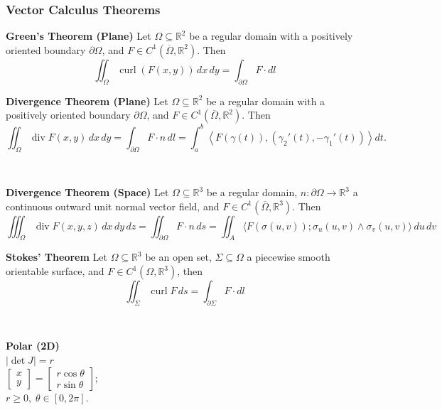 \documentclass[8pt]{article}
\begin{document}
\subsubsection*{Vector Calculus Theorems}
\begin{minipage}[htp]{0.49\textwidth}
\noindent\textbf{Green's Theorem (Plane)}
Let \( \Omega \subseteq \mathbb{R}^2 \) be a regular domain with a positively oriented boundary \( \partial \Omega \), and \( F \in C^1(\overline{\Omega}, \mathbb{R}^2) \). Then
\vspace{-10px}\[
\iint_{\Omega} \operatorname{curl}(F(x, y)) \, dx \, dy = \int_{\partial \Omega} F \cdot dl
\]
\end{minipage}
\hfill
\begin{minipage}[htp]{0.49\textwidth}
\noindent\textbf{Divergence Theorem (Plane)}
Let \( \Omega \subseteq \mathbb{R}^2 \) be a regular domain with a positively oriented boundary \( \partial \Omega \), and \( F \in C^1(\overline{\Omega}, \mathbb{R}^2) \). Then
\vspace{-10px}\[
\iint_{\Omega} \operatorname{div} F(x, y) \, dx \, dy = \int_{\partial \Omega} F \cdot n \, dl = \int_a^b \left\langle F(\gamma(t)), (\gamma_2'(t), -\gamma_1'(t)) \right\rangle dt.
\]
\end{minipage}
\\
\begin{minipage}[htp]{0.49\textwidth}
\noindent\textbf{Divergence Theorem (Space)}
Let \( \Omega \subseteq \mathbb{R}^3 \) be a regular domain, \( n : \partial \Omega \to \mathbb{R}^3 \) a continuous outward unit normal vector field, and \( F \in C^1(\overline{\Omega}, \mathbb{R}^3) \). Then
\vspace{-10px}\[
\iiint_{\Omega} \operatorname{div} F(x,y,z) \, dx \, dy \, dz = \iint_{\partial \Omega} F \cdot n \, ds = \iint_{A} \langle F(\sigma(u,v)); \sigma_u(u,v) \wedge \sigma_v(u,v) \rangle \, du \, dv
\]
\end{minipage}
\hfill
\begin{minipage}[htp]{0.49\textwidth}
\noindent\textbf{Stokes' Theorem}
Let \( \Omega \subseteq \mathbb{R}^3 \) be an open set, \( \Sigma \subseteq \Omega \) a piecewise smooth orientable surface, and \( F \in C^1(\Omega, \mathbb{R}^3) \), then
\vspace{-10px}\[
\iint_{\Sigma} \operatorname{curl} F \, ds = \int_{\partial \Sigma} F \cdot dl
\]
\end{minipage}\\
\begin{minipage}[t]{0.27\textwidth}
    \centering
  \noindent  \textbf{Polar (2D)} \\[4pt]
    \(|\det J| = r\) \\[4pt]
    \(\displaystyle
    \begin{bmatrix}
    x \\[4pt]
    y
    \end{bmatrix}
    =
    \begin{bmatrix}
    r\cos\theta \\[4pt]
    r\sin\theta
    \end{bmatrix};
    \) \\[4pt]
    \( r \geq 0, \; \theta \in [0, 2\pi] \).
\end{minipage}
\end{document}
